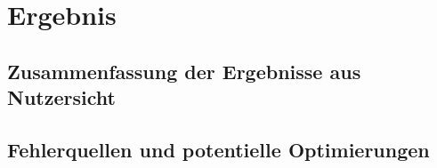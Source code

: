 \section{Ergebnis}
\subsection{Zusammenfassung der Ergebnisse aus Nutzersicht}
\subsection{Fehlerquellen und potentielle Optimierungen}